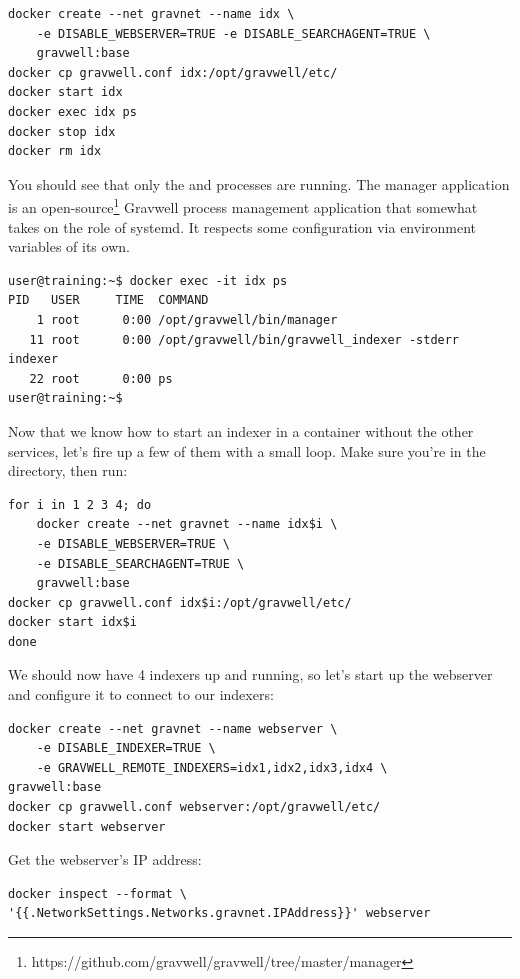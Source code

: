 \begin{Verbatim}[breaklines=true]
docker create --net gravnet --name idx \
    -e DISABLE_WEBSERVER=TRUE -e DISABLE_SEARCHAGENT=TRUE \
    gravwell:base
docker cp gravwell.conf idx:/opt/gravwell/etc/
docker start idx
docker exec idx ps
docker stop idx
docker rm idx
\end{Verbatim}

You should see that only the  and  processes are
running. The manager application is an open-source\footnote{https://github.com/gravwell/gravwell/tree/master/manager} Gravwell
process management application that somewhat takes on the role of
systemd. It respects some configuration via environment variables of its own.

\begin{Verbatim}[breaklines=true]
user@training:~$ docker exec -it idx ps
PID   USER     TIME  COMMAND
    1 root      0:00 /opt/gravwell/bin/manager
   11 root      0:00 /opt/gravwell/bin/gravwell_indexer -stderr indexer
   22 root      0:00 ps
user@training:~$
\end{Verbatim}

Now that we know how to start an indexer in a container without the
other services, let's fire up a few of them with a small loop. Make sure
you're in the \code{Indexers/Lab-Docker/config} directory, then run:

\begin{Verbatim}[breaklines=true]
for i in 1 2 3 4; do
    docker create --net gravnet --name idx$i \
    -e DISABLE_WEBSERVER=TRUE \
    -e DISABLE_SEARCHAGENT=TRUE \
    gravwell:base
docker cp gravwell.conf idx$i:/opt/gravwell/etc/
docker start idx$i
done
\end{Verbatim}

We should now have 4 indexers up and running, so let's start up the
webserver and configure it to connect to our indexers:

\begin{Verbatim}[breaklines=true]
docker create --net gravnet --name webserver \
    -e DISABLE_INDEXER=TRUE \
    -e GRAVWELL_REMOTE_INDEXERS=idx1,idx2,idx3,idx4 \
gravwell:base
docker cp gravwell.conf webserver:/opt/gravwell/etc/
docker start webserver
\end{Verbatim}

Get the webserver's IP address:

\begin{Verbatim}[breaklines=true]
docker inspect --format \
'{{.NetworkSettings.Networks.gravnet.IPAddress}}' webserver
\end{Verbatim}

